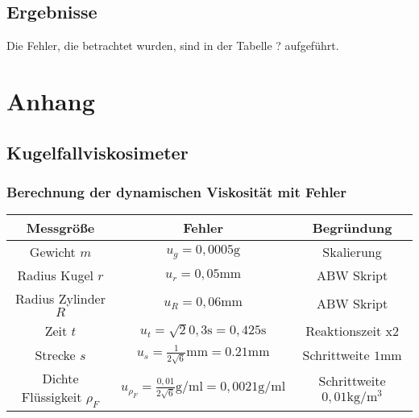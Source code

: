 \documentclass[11pt, a4paper]{article}
\begin{document}
    \subsection{Ergebnisse}

    Die Fehler, die betrachtet wurden, sind in der Tabelle ? aufgeführt.



    \section{Anhang}
    \subsection{Kugelfallviskosimeter}

    \subsubsection{Berechnung der dynamischen Viskosität mit Fehler}
    
    \begin{table}
       \begin{adjustwidth}{-5cm}{-5cm}
            \centering
            \begin{tabular}{c c c}
                Messgröße & Fehler & Begründung \\ \hline
                Gewicht $m$ & $u_g = 0,0005 \si{\gram}$ & Skalierung \\
                Radius Kugel $r$ & $u_r = 0,05 \si{\milli\meter}$ & ABW Skript \cite[Tabelle 6]{ABW} \\
                Radius Zylinder $R$ & $u_R = 0,06 \si{\milli\meter}$ & ABW Skript \cite[Tabelle 6]{ABW} \\
                Zeit $t$ & $u_t = \sqrt{2} 0,3\si{\second} = 0,425 \si{\second}$ & Reaktionszeit x2\\
                Strecke $s$ & $u_s = \frac{1}{2\sqrt{6}} \si{\milli\metre} = 0.21 \si{\milli\metre}$ & Schrittweite $1 \si{\milli\metre}$ \\
                Dichte Flüssigkeit $\rho_F$ & $u_{\rho_F} = \frac{0,01}{2\sqrt{6}} \si{\gram \per \milli\litre} = 0,0021  \si{\gram\per\milli\litre}$ & Schrittweite $0,01 \si{\kilogram\per\cubic\metre}$ \\

            \end{tabular}
        \end{adjustwidth}
    \end{table}
    
\end{document}
